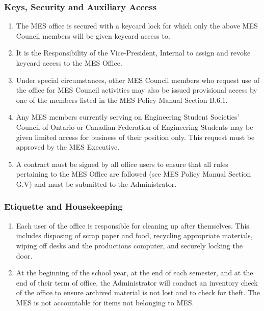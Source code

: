 \subsubsection{Keys, Security and Auxiliary Access}
\label{keys-security-and-auxiliary-access}
\begin{enumerate}
 \item
  The MES office is secured with a keycard lock for which only the above MES Council members will be given keycard access to.
 \item
  It is the Responsibility of the Vice-President, Internal to assign and revoke keycard access to the MES Office.
 \item
  Under special circumstances, other MES Council members who request use of the office for MES Council activities may also be issued provisional access by one of the members listed in the MES Policy Manual Section B.6.1.
 \item
  Any MES members currently serving on Engineering Student Societies' Council of Ontario or Canadian Federation of Engineering Students may be given limited access for business of their position only. This request must be approved by the MES Executive.
 \item
  A contract must be signed by all office users to ensure that all rules pertaining to the MES Office are followed (see MES Policy Manual Section G.V) and must be submitted to the Administrator. %

\end{enumerate}

\subsubsection{Etiquette and Housekeeping}
\label{etiquette-and-housekeeping}
\begin{enumerate}
 \item
  Each user of the office is responsible for cleaning up after themselves. This includes disposing of scrap paper and food, recycling appropriate materials, wiping off desks and the productions computer, and securely locking the door.
 \item
  At the beginning of the school year, at the end of each semester, and at the end of their term of office, the Administrator will conduct an inventory check of the office to ensure archived material is not lost and to check for theft. The MES is not accountable for items not belonging to MES.

\end{enumerate}

